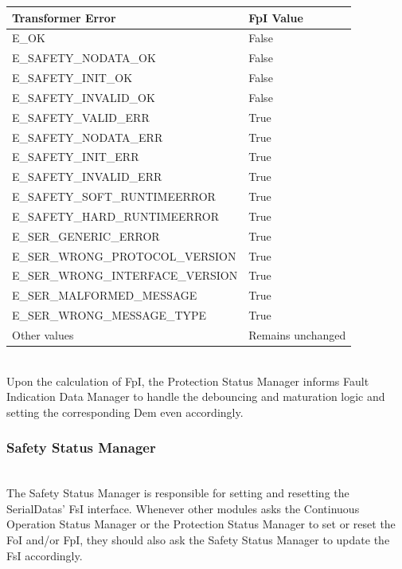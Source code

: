 \begin{table}[H]
    \begin{tabular}{|l|l|}
    \hline
    \textbf{Transformer Error} &  \textbf{FpI Value}\\ \hline
    E_OK                           & False \\ \hline
    E_SAFETY_NODATA_OK             & False \\ \hline
    E_SAFETY_INIT_OK               & False \\ \hline
    E_SAFETY_INVALID_OK            & False \\ \hline
    E_SAFETY_VALID_ERR             & True \\ \hline
    E_SAFETY_NODATA_ERR            & True \\ \hline
    E_SAFETY_INIT_ERR              & True \\ \hline
    E_SAFETY_INVALID_ERR           & True \\ \hline
    E_SAFETY_SOFT_RUNTIMEERROR     & True \\ \hline
    E_SAFETY_HARD_RUNTIMEERROR     & True \\ \hline
    E_SER_GENERIC_ERROR            & True \\ \hline
    E_SER_WRONG_PROTOCOL_VERSION   & True \\ \hline
    E_SER_WRONG_INTERFACE_VERSION  & True \\ \hline
    E_SER_MALFORMED_MESSAGE        & True \\ \hline
    E_SER_WRONG_MESSAGE_TYPE       & True \\ \hline
    Other values                   & Remains unchanged \\ \hline
    \end{tabular}
\end{table}

{  }

\\

Upon the calculation of FpI, the Protection Status Manager informs Fault Indication Data Manager 
to handle the debouncing and maturation logic and setting the corresponding Dem even accordingly.

{    }


\subsubsection{Safety Status Manager}
\\
\label{sec:SafetyStatusDynamic}
The Safety Status Manager is responsible for setting and resetting the SerialDatas' FsI interface. 
Whenever other modules asks the Continuous Operation Status Manager or the Protection Status Manager to set or reset the FoI and/or FpI,
they should also ask the Safety Status Manager to update the FsI accordingly.

